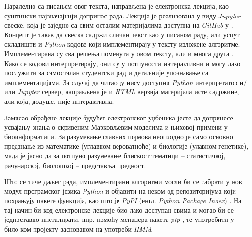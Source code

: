 \documentclass[12pt,oneside]{memoir}
\begin{document}
\begin{CJK}{UTF8}{ipxm}
Паралелно са писањем овог текста, направљена је електронска лекција, као суштински најзначајнији допринос рада. Лекција је реализована у виду \textit{Jupyter} свеске, која је заједно са свим осталим материјалима доступна на \textit{GitHub}-у \cite{vasovich2021}. Концепт је такав да свеска садржи сличан текст као у писаном раду, али успут складишти и \textit{Python} кодове који имплементирају у тексту изложене алгоритме. Имплементирана су сва решења поменута у овом тексту, али и многа друга \cite{compeau2015}. Како се кодови интерпретирају, они су у потпуности интерактивни и могу лако послужити за самосталан студентски рад и детаљније упознавање са имплементацијама. За случај да читаоцу нису доступни \textit{Python} интерпретатор и/или \textit{Jupyter} сервер, направљена је и \textit{HTML} верзија материјала исте садржине, али која, додуше, није интерактивна.

Замисао обрађене лекције будућег електронског уџбеника јесте да допринесе усвајању знања о скривеним Марковљевим моделима и њиховој примени у биоинформатици. За разумевање главних појмова неопходно је само основно предзнање из математике (углавном вероватноће) и биологије (улавном генетике), мада је јасно да за потпуно разумевање блискост тематици -- статистичкој, рачунарској, биолошкој -- представља предност.

Што се тиче даљег рада, имплементирани алгоритми могли би се сабрати у нов модул програмског језика \textit{Python} и објавити на неком од репозиторијума који похрањују пакете функција, као што је \textit{PyPI} (енгл. \textit{Python Package Index}) \cite{pypi}. На тај начин би код електронске лекције био лако доступан свима и могао би се једноставно инсталирати, нпр. помоћу менаџера пакета \textit{pip} \cite{pip}, те употребити у било ком пројекту заснованом на употреби \textit{HMM}.

\literatura

\end{CJK}
\end{document}
